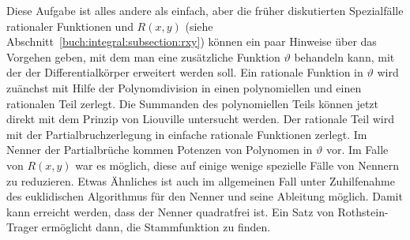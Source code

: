 Diese Aufgabe ist alles andere als einfach, aber die früher diskutierten
Spezialfälle rationaler Funktionen und $R(x,y)$
(siehe Abschnitt~\ref{buch:integral:subsection:rxy}) können ein paar
Hinweise über das Vorgehen geben, mit dem man eine zusätzliche
Funktion $\vartheta$ behandeln kann, mit der der Differentialkörper
erweitert werden soll.
Ein rationale Funktion in $\vartheta$ wird zuänchst mit Hilfe der
Polynomdivision in einen polynomiellen und einen rationalen
Teil zerlegt.
Die Summanden des polynomiellen Teils können jetzt direkt mit
dem Prinzip von Liouville untersucht werden.
Der rationale Teil wird mit der Partialbruchzerlegung in
einfache rationale Funktionen zerlegt.
Im Nenner der Partialbrüche kommen Potenzen von Polynomen in $\vartheta$
vor. 
Im Falle von $R(x,y)$ war es möglich, diese auf einige wenige spezielle
Fälle von Nennern zu reduzieren.
Etwas Ähnliches ist auch im allgemeinen Fall unter Zuhilfenahme
des euklidischen Algorithmus für den Nenner und seine Ableitung möglich.
Damit kann erreicht werden, dass der Nenner quadratfrei ist.
Ein Satz von Rothstein-Trager ermöglicht dann, die Stammfunktion zu finden.

